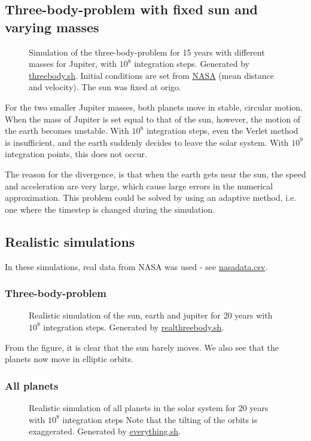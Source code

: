 \documentclass[12pt,english,a4paper]{article}
\newcommand{\program}[1]{\href{https://github.com/anjohan/Offentlig/blob/master/FYS3150/Oblig3/#1}{#1}}
\begin{document}
\subsection{Three-body-problem with fixed sun and varying masses}
\begin{figure}[H]
\centering

\caption{Simulation of the three-body-problem for 15 years with different masses for Jupiter, with \(10^8\) integration steps. Generated by \program{threebody.sh}. Initial conditions are set from \href{http://nssdc.gsfc.nasa.gov/planetary/factsheet/jupiterfact.html}{NASA} (mean distance and velocity). The sun was fixed at origo.}
\end{figure}
For the two smaller Jupiter masses, both planets move in stable, circular motion. When the mass of Jupiter is set equal to that of the sun, however, the motion of the earth becomes unstable. With \(10^8\) integration steps, even the Verlet method is insufficient, and the earth suddenly decides to leave the solar system. With \(10^9\) integration points, this does not occur.

The reason for the divergence, is that when the earth gets near the sun, the speed and acceleration are very large, which cause large errors in the numerical approximation. This problem could be solved by using an adaptive method, i.e. one where the timestep is changed during the simulation.

\subsection{Realistic simulations}
In these simulations, real data from NASA was used - see \program{nasadata.csv}.
\subsubsection{Three-body-problem}
\begin{figure}[H]
\centering

\caption{Realistic simulation of the sun, earth and jupiter for 20 years with \(10^8\) integration steps. Generated by \program{realthreebody.sh}.}
\end{figure}
From the figure, it is clear that the sun barely moves. We also see that the planets now move in elliptic orbits.

\subsubsection{All planets}
\begin{figure}[H]
\centering

\caption{Realistic simulation of all planets in the solar system for 20 years with \(10^8\) integration steps Note that the tilting of the orbits is exaggerated. Generated by \program{everything.sh}.}
\end{figure}
\end{document}
